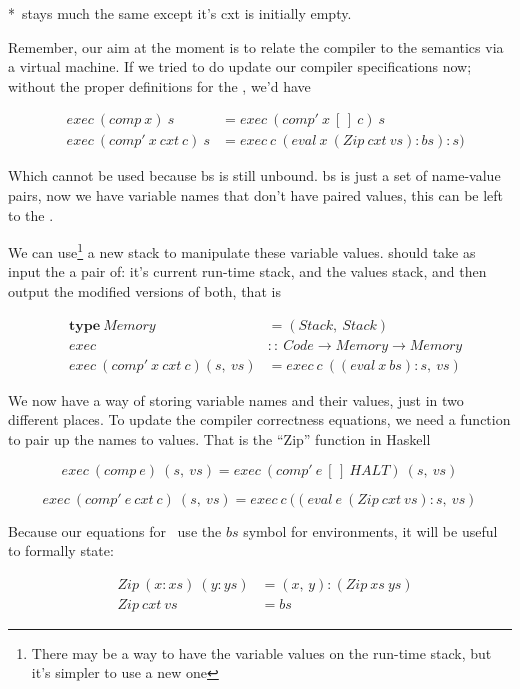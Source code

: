 \documentclass {article}
\begin{document}
*\comp\ stays much the same except it's cxt
	is initially empty.

Remember, our aim at the moment
is to relate the compiler to the
semantics via a virtual machine.
If we tried to do update our compiler 
specifications now; 
without the proper definitions
for the \vm, we'd have

\begin{eqnarray*}
	&exec\ (comp\ x)\ s  
		&= exec\ (comp'\ x\ [\,]\ c)\ s  \\
	&exec\ (comp'\ x\ cxt\ c)\ s  
		&= exec\ c\ (eval\ x\ (Zip\ cxt\ vs):bs):s)
\end{eqnarray*}

Which cannot be used
because bs is still unbound.
bs is just a set of name-value pairs,
now we have variable names
that don't have paired values,
this can be left to the \vm.

We can use\footnote{
There may be a way to have the variable values
on the run-time stack, but it's
simpler to use a new one}
a new stack to
manipulate these variable values.
\exec should take as input
the a pair of:
it's current run-time stack,
and the values stack,
and then output the modified versions of both,
that is

\begin{eqnarray*}
	&\textbf{type}\ Memory\ &= (Stack,\ Stack) \\
	&exec &::\ Code \rightarrow Memory \rightarrow Memory \\
	&exec\ (comp'\ x\ cxt\ c) (s,\ vs) &= exec\ c\ ((eval\ x\ bs):s,\ vs)
\end{eqnarray*}

We now have a way of storing variable names
and their values, 
just in two different places.
To update the compiler correctness equations,
we need a function to pair up the names
to values.
That is the ``Zip'' function in Haskell

\begin{spec}
	\[ exec\ (comp\ e)\ (s,\ vs) 
		= exec\ (comp'\ e\ [\,]\ HALT)\ (s,\ vs) \]
\end{spec}
\begin{spec}
	\[ exec\ (comp'\ e\ cxt\ c)\ (s,\ vs) 
		= exec\ c\ ((eval\ e\ (Zip\ cxt\ vs):s,\ vs) \]
\end{spec}

Because our equations for \eval\
use the $bs$ symbol for environments,
it will be useful to formally state:

\begin{eqnarray}
&Zip\ (x:xs)\ (y:ys) &= (x,\, y):(Zip\ xs\ ys)  \\ \label{ziden}
&Zip\ cxt\ vs &= bs \label{zcxtvs}
\end{eqnarray}
	
\end{document}
